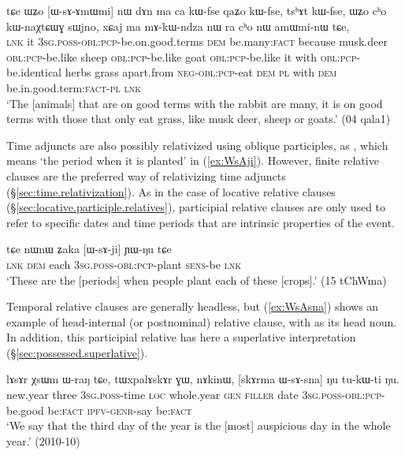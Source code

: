 \begin{exe}
   \ex \label{ex:WsAmWmi}
 \gll  tɕe ɯʑo [ɯ-sɤ-ɤmɯmi] nɯ dɤn ma ca kɯ-fse qaʑo kɯ-fse, tsʰɤt kɯ-fse,  ɯʑo cʰo kɯ-naχtɕɯɣ sɯjno, xɕaj ma mɤ-kɯ-ndza nɯ ra cʰo nɯ amɯmi-nɯ tɕe, \\
\textsc{lnk} it \textsc{3sg}.\textsc{poss}-\textsc{obl}:\textsc{pcp}-be.on.good.terms \textsc{dem} be.many:\textsc{fact} because musk.deer \textsc{obl}:\textsc{pcp}-be.like sheep \textsc{obl}:\textsc{pcp}-be.like goat  \textsc{obl}:\textsc{pcp}-be.like it with  \textsc{obl}:\textsc{pcp}-be.identical herbs grass apart.from \textsc{neg}-\textsc{obl}:\textsc{pcp}-eat \textsc{dem} \textsc{pl} with \textsc{dem} be.in.good.term:\textsc{fact}-\textsc{pl} \textsc{lnk} \\
\glt `The [animals] that are on good terms with the rabbit are many, it is on good terms with those that only eat grass, like musk deer, sheep or goats.' (04 qala1)
\end{exe}

Time adjuncts are also possibly relativized using oblique participles, as , which means `the period when it is planted' in (\ref{ex:WsAji}). However, finite relative clauses are the preferred way of relativizing time adjuncts (§\ref{sec:time.relativization}). As in the case of locative relative clauses (§\ref{sec:locative.participle.relatives}), participial relative clauses are only used to refer to specific dates and time periods that are intrinsic properties of the event.

\begin{exe}
   \ex \label{ex:WsAji}
   \gll    tɕe nɯnɯ ʑaka [ɯ-sɤ-ji] ɲɯ-ŋu tɕe \\
   \textsc{lnk} \textsc{dem} each \textsc{3sg}.\textsc{poss}-\textsc{obl}:\textsc{pcp}-plant \textsc{sens}-be \textsc{lnk}\\
\glt `These are the [periods] when people plant each of these [crops].' (15 tChWma)
\end{exe}

Temporal relative clauses are generally headless, but (\ref{ex:WsAsna}) shows an example of head-internal (or postnominal) relative clause, with  as its head noun. In addition, this participial relative has here a superlative interpretation (§\ref{sec:possessed.superlative}).

\begin{exe}
   \ex \label{ex:WsAsna}
   \gll    lɤsɤr χsɯm ɯ-raŋ tɕe, tɯxpalɤskɤr ɣɯ, nɤkinɯ, [skɤrma ɯ-sɤ-sna] ŋu tu-kɯ-ti ŋu. \\
   new.year three \textsc{3sg}.\textsc{poss}-time \textsc{loc} whole.year \textsc{gen} \textsc{filler} date \textsc{3sg}.\textsc{poss}-\textsc{obl}:\textsc{pcp}-be.good be:\textsc{fact} \textsc{ipfv}-\textsc{genr}-say be:\textsc{fact} \\
\glt `We say that the third day of the year is the [most] auspicious day in the whole year.' (2010-10)
\end{exe}

